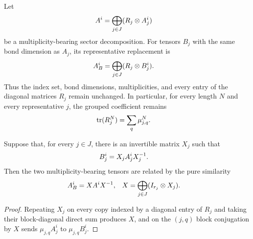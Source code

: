 \begin{definition}
    \label{def:periodic_sector_basis_replacement}
    \leanok
    Let
    \begin{align}
        A^i & =\bigoplus_{j\in J}(R_j\otimes A_j^i)
        \notag
    \end{align}
    be a multiplicity-bearing sector decomposition.  For tensors $B_j$ with
    the same bond dimension as $A_j$, its representative replacement is
    \begin{align}
        A_B^i & =\bigoplus_{j\in J}(R_j\otimes B_j^i).
        \notag
    \end{align}
    Thus the index set, bond dimensions, multiplicities, and every entry of
    the diagonal matrices $R_j$ remain unchanged.  In particular, for every
    length $N$ and every representative $j$, the grouped coefficient remains
    \begin{align}
        \operatorname{tr}(R_j^N) & =\sum_q\mu_{j,q}^N.
        \notag
    \end{align}
\end{definition}

\begin{lemma}
    \label{thm:periodic_sector_basis_replacement_gauge}
    \leanok
    Suppose that, for every $j\in J$, there is an invertible matrix $X_j$
    such that
    \begin{align}
        B_j^i & =X_jA_j^iX_j^{-1}.
        \notag
    \end{align}
    Then the two multiplicity-bearing tensors are related by the pure
    similarity
    \begin{align}
        A_B^i & =XA^iX^{-1},                             &
        X     & =\bigoplus_{j\in J}(I_{r_j}\otimes X_j).
        \notag
    \end{align}
\end{lemma}
\begin{proof}
    \leanok
    Repeating $X_j$ on every copy indexed by a diagonal entry of $R_j$ and
    taking their block-diagonal direct sum produces $X$, and on the $(j,q)$
    block conjugation by $X$ sends $\mu_{j,q}A_j^i$ to $\mu_{j,q}B_j^i$.
\end{proof}

